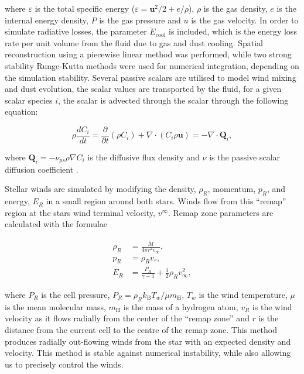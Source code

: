 \documentclass[fleqn,usenatbib]{mnras}
\begin{document}
\noindent
where $\varepsilon$ is the total specific energy ($\varepsilon = \boldsymbol{u}^2/2 + e/\rho $), $\rho$ is the gas density, $e$ is the internal energy density, $P$ is the gas pressure and $u$ is the gas velocity.
In order to simulate radiative losses, the parameter $\dot E_\text{cool}$ is included, which is the energy loss rate per unit volume from the fluid due to gas and dust cooling.
Spatial reconstruction using a piecewise linear method was performed, while two strong stability Runge-Kutta methods were used for numerical integration, depending on the simulation stability.
Several passive scalars are utilised to model wind mixing and dust evolution, the scalar values are transported by the fluid, for a given scalar species $i$, the scalar is advected through the scalar through the following equation:

\begin{equation}
  \rho \frac{dC_i}{dt} = \frac{\partial}{\partial t} \left( \rho C_i \right) + \nabla \cdot \left( C_i \rho \mathbf{u} \right) = -\nabla \cdot \mathbf{Q}_i ,  
\end{equation}

\noindent
where $\mathbf{Q}_i = - \nu_{ps} \rho \nabla C_i$ is the diffusive flux density and $\nu$ is the passive scalar diffusion coefficient \citep{stoneAthenaAdaptiveMesh2020}.


Stellar winds are simulated by modifying the density, $\rho_R$, momentum, $p_R$, and energy, $E_R$ in a small region around both stars.
Winds flow from this ``remap'' region at the stars wind terminal velocity, $v^\infty$. Remap zone parameters are calculated with the formulae

\begin{subequations}
  \begin{align}
    \rho_R & = \frac{\dot M}{4 \pi r^2 v_\infty} , \\
    p_R    & = \rho_R v_{r} , \\
    E_R    & = \frac{P_R}{\gamma - 1} + \frac{1}{2} \rho_R v_\infty^2 ,
  \end{align}
\end{subequations}

\noindent
where $P_R$ is the cell pressure, $P_R = \rho_R k_\text{B} T_w / \mu m_\text{H}$, $T_w$ is the wind temperature, $\mu$ is the mean molecular mass, $m_\text{H}$ is the mass of a hydrogen atom, $v_R$ is the wind velocity as it flows radially from the center of the ``remap zone'' and $r$ is the distance from the current cell to the centre of the remap zone.
This method produces radially out-flowing winds from the star with an expected density and velocity.
This method is stable against numerical instability, while also allowing us to precisely control the winds.
\end{document}
